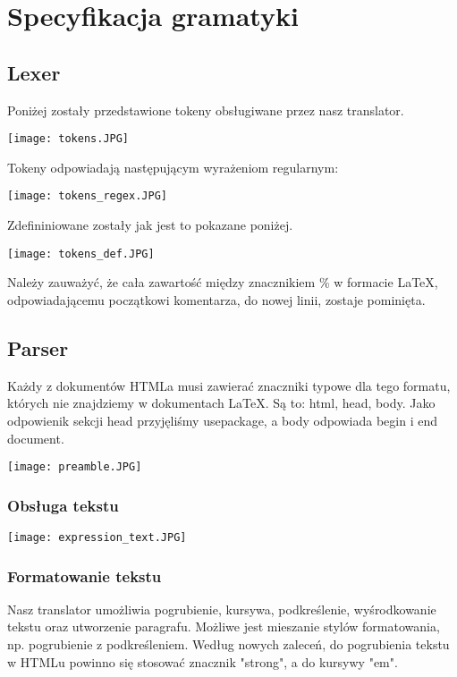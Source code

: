 \chapter{Specyfikacja gramatyki}


\section{Lexer}
Poniżej zostały przedstawione tokeny obsługiwane przez nasz translator.

\texttt{[image: tokens.JPG]}


Tokeny odpowiadają następującym wyrażeniom regularnym:

\texttt{[image: tokens\_regex.JPG]}


Zdefininiowane zostały jak jest to pokazane poniżej.

\texttt{[image: tokens\_def.JPG]}

Należy zauważyć, że cała zawartość między znacznikiem \% w formacie LaTeX, odpowiadającemu początkowi komentarza, do nowej linii, 
zostaje pominięta.

\section{Parser}

Każdy z dokumentów HTMLa musi zawierać znaczniki typowe dla tego formatu, których nie znajdziemy w dokumentach LaTeX. Są to: html,
head, body. Jako odpowienik sekcji head przyjęliśmy usepackage, a body odpowiada begin i end document.

\texttt{[image: preamble.JPG]}

\subsection{Obsługa tekstu}

\texttt{[image: expression\_text.JPG]}

\subsection{Formatowanie tekstu}

Nasz translator umożliwia pogrubienie, kursywa, podkreślenie, wyśrodkowanie tekstu oraz utworzenie paragrafu. Możliwe jest mieszanie
stylów formatowania, np. pogrubienie z podkreśleniem. Według nowych zaleceń, do pogrubienia tekstu w HTMLu powinno się stosować znacznik
"strong", a do kursywy "em".

